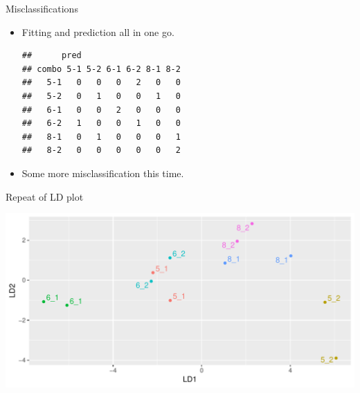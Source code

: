 \begin{frame}[fragile]{Misclassifications}
  \begin{itemize}
  \item Fitting and prediction all in one go.
  
\begin{knitrout}
\color{fgcolor}\begin{kframe}
\begin{alltt}
\hlkwb{=}\hlopt{~}\hlopt{+}\hlopt{+}
\hlopt{$}
\end{alltt}
\begin{verbatim}
##      pred
## combo 5-1 5-2 6-1 6-2 8-1 8-2
##   5-1   0   0   0   2   0   0
##   5-2   0   1   0   0   1   0
##   6-1   0   0   2   0   0   0
##   6-2   1   0   0   1   0   0
##   8-1   0   1   0   0   0   1
##   8-2   0   0   0   0   0   2
\end{verbatim}
\end{kframe}
\end{knitrout}

\item Some more misclassification this time.
  \end{itemize}

\end{frame}

\begin{frame}[fragile]{Repeat of LD plot}
 
\begin{knitrout}
\color{fgcolor}\begin{kframe}
\begin{alltt}
\end{alltt}
\end{kframe}
\includegraphics[width=\maxwidth]{figure/graziani-1} 

\end{knitrout}
  
\end{frame}

